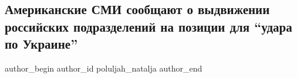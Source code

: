  
 
 
 
 
 
\subsection{Американские СМИ сообщают о выдвижении российских подразделений на позиции для \enquote{удара по Украине}}
\label{sec:14_02_2022.stz.news.ua.strana.2.rossia_armia_usa_smi_udar_po_ukraine}
 
\ifcmt
 author_begin
   author_id poluljah_natalja
 author_end
\fi
